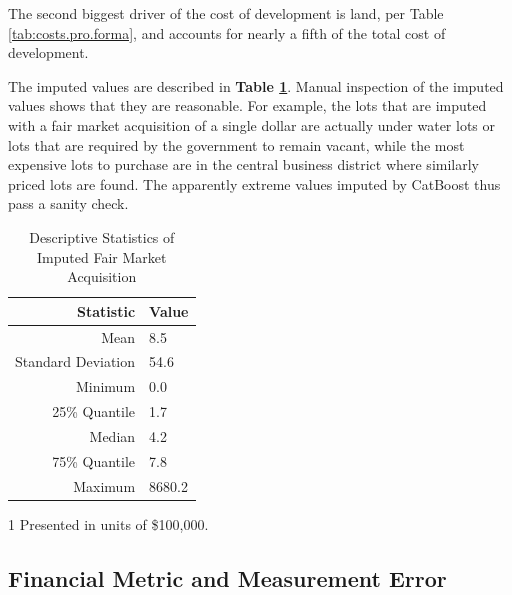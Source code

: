 \documentclass[a4paper,12pt]{article}
\begin{document}
The second biggest driver of the cost of development is land, per Table \ref{tab:costs.pro.forma}, and accounts for nearly a fifth of the total cost of development. 


   
The imputed values are described in \textbf{Table \ref{tab:ImputedFairMarketAcquisition}}. Manual inspection of the imputed values shows that they are reasonable. For example, the lots that are imputed with a fair market acquisition of a single dollar are actually under water lots or lots that are required by the government to remain vacant, while the most expensive lots to purchase are in the central business district where similarly priced lots are found. The apparently extreme values imputed by CatBoost thus pass a sanity check.

\begin{table}[bth]
    \centering
    \caption{Descriptive Statistics of Imputed Fair Market Acquisition}
    \label{tab:ImputedFairMarketAcquisition}
    \setlength{\tabcolsep}{12pt}
    \begin{threeparttable}
        \begin{tabular}{rl}
        \hline
        Statistic & Value\tnote{1} \\
        \midrule
        Mean & 8.5 \\
        Standard Deviation & 54.6 \\
        Minimum & 0.0 \\
        25\% Quantile & 1.7 \\
        Median & 4.2 \\
        75\% Quantile & 7.8 \\
        Maximum & 8680.2 \\
        \hline
        \end{tabular}
    \begin{tablenotes}
        \item[1]Presented in units of \$100,000.
    \end{tablenotes}
    \end{threeparttable}
\end{table}
   \setlength{\tabcolsep}{0pt}



\subsection{Financial Metric and Measurement Error}
\label{measure.error}
\end{document}

